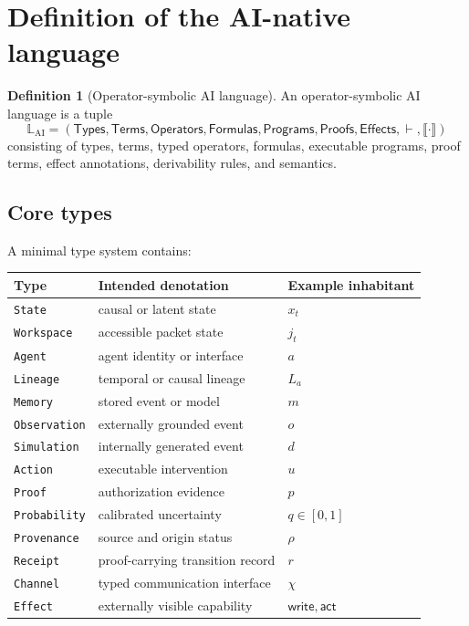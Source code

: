 \documentclass[11pt]{article}
\theoremstyle{definition}
\newtheorem{definition}[theorem]{Definition}
\theoremstyle{remark}
\newcommand{\LangAI}{\mathbb L_{\mathrm{AI}}}
\newcommand{\Types}{\mathsf{Types}}
\newcommand{\Terms}{\mathsf{Terms}}
\newcommand{\Ops}{\mathsf{Operators}}
\newcommand{\Forms}{\mathsf{Formulas}}
\newcommand{\Programs}{\mathsf{Programs}}
\newcommand{\Proofs}{\mathsf{Proofs}}
\newcommand{\Sem}[1]{\llbracket #1\rrbracket}
\newcommand{\Effects}{\mathsf{Effects}}
\begin{document}
\section{Definition of the AI-native language}

\begin{definition}[Operator-symbolic AI language]
An operator-symbolic AI language is a tuple
\[
\LangAI
=
(\Types,\Terms,\Ops,\Forms,\Programs,\Proofs,\Effects,\vdash,\Sem{\cdot})
\]
consisting of types, terms, typed operators, formulas, executable programs, proof terms, effect annotations, derivability rules, and semantics.
\end{definition}

\subsection{Core types}

A minimal type system contains:
\begin{center}
\begin{tabular}{lll}
\toprule
Type & Intended denotation & Example inhabitant \\
\midrule
\texttt{State} & causal or latent state & \(x_t\) \\
\texttt{Workspace} & accessible packet state & \(j_t\) \\
\texttt{Agent} & agent identity or interface & \(a\) \\
\texttt{Lineage} & temporal or causal lineage & \(L_a\) \\
\texttt{Memory} & stored event or model & \(m\) \\
\texttt{Observation} & externally grounded event & \(o\) \\
\texttt{Simulation} & internally generated event & \(d\) \\
\texttt{Action} & executable intervention & \(u\) \\
\texttt{Proof} & authorization evidence & \(p\) \\
\texttt{Probability} & calibrated uncertainty & \(q\in[0,1]\) \\
\texttt{Provenance} & source and origin status & \(\rho\) \\
\texttt{Receipt} & proof-carrying transition record & \(r\) \\
\texttt{Channel} & typed communication interface & \(\chi\) \\
\texttt{Effect} & externally visible capability & \(\mathsf{write},\mathsf{act}\) \\
\bottomrule
\end{tabular}
\end{center}
\end{document}
